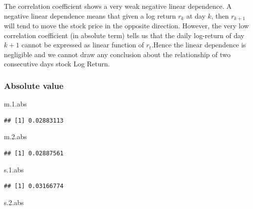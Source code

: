 \documentclass[
]{article}
\newenvironment{Shaded}{\begin{snugshade}}{\end{snugshade}}
\newcommand{\FloatTok}[1]{\textcolor[rgb]{0.00,0.00,0.81}{#1}}
\newcommand{\NormalTok}[1]{#1}
\begin{document}
The correlation coefficient shows a very weak negative linear
dependence. A negative linear dependence means that given a log return
\(r_k\) at day \(k\), then \(r_{k+1}\) will tend to move the stock price
in the opposite direction. However, the very low correlation coefficient
(in absolute term) tells us that the daily log-return of day \(k+1\)
cannot be expressed as linear function of \(r_t\).Hence the linear
dependence is negligible and we cannot draw any conclusion about the
relationship of two consecutive days stock Log Return.

\hypertarget{absolute-value}{%
\subsubsection{Absolute value}\label{absolute-value}}

\begin{Shaded}
\begin{Highlighting}[]
\NormalTok{m.}\FloatTok{1.}\NormalTok{abs }
\end{Highlighting}
\end{Shaded}

\begin{verbatim}
## [1] 0.02883113
\end{verbatim}

\begin{Shaded}
\begin{Highlighting}[]
\NormalTok{m.}\FloatTok{2.}\NormalTok{abs }
\end{Highlighting}
\end{Shaded}

\begin{verbatim}
## [1] 0.02887561
\end{verbatim}

\begin{Shaded}
\begin{Highlighting}[]
\NormalTok{s.}\FloatTok{1.}\NormalTok{abs }
\end{Highlighting}
\end{Shaded}

\begin{verbatim}
## [1] 0.03166774
\end{verbatim}

\begin{Shaded}
\begin{Highlighting}[]
\NormalTok{s.}\FloatTok{2.}\NormalTok{abs }
\end{Highlighting}
\end{Shaded}
\end{document}
